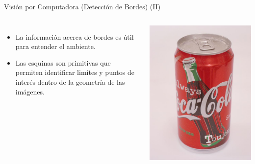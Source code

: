 \begin{frame}{Visión por Computadora (Detección de Bordes) (II)}
  \begin{columns}
  \begin{itemize}
    \item La información acerca de bordes es útil para entender el ambiente.
    \item Las esquinas son primitivas que permiten identificar limites y puntos de interés dentro de la geometría de las imágenes.
  \end{itemize}  
        \begin{center}
            \includegraphics[width=\textwidth]{Figs/VC_CocaOrig}\\
     \end{center}
      

\end{columns}
\end{frame}
